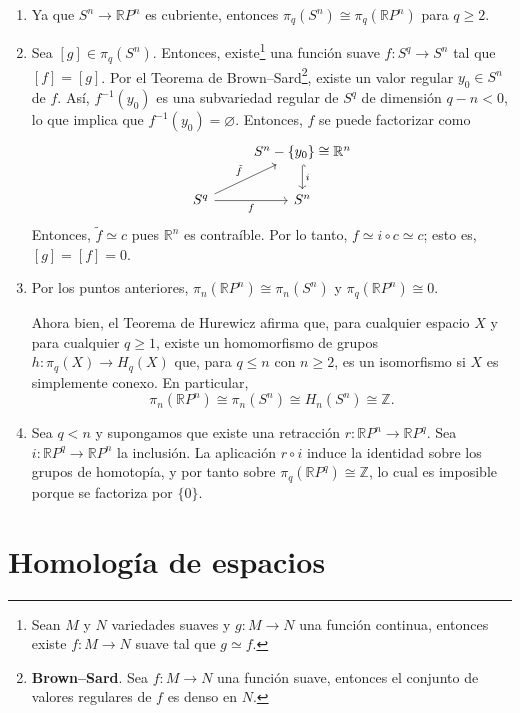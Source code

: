 \documentclass[11pt,a4paper]{article}
\theoremstyle{plain}
\theoremstyle{definition}
\theoremstyle{remark}
\newcommand{\RR}{\mathbb R}
\newcommand{\ZZ}{\mathbb Z}
\begin{document}
\begin{enumerate}[label=\arabic*.,leftmargin=*]
\begin{enumerate}[label=\alph*)]
También, es posible usar el ejercicio 4 como sigue:
\[
\pi_q(\mathbb T^2)=\pi_q(S^1)\oplus\pi_q(S^1)=\begin{cases}\ZZ\oplus\ZZ & q=1\\0 & q\ge0.\end{cases}
\]
\item Ya que $S^n\to\RR P^n$ es cubriente, entonces
$\pi_q(S^n)\cong\pi_q(\RR P^n)$ para $q\ge2$.
\item Sea $[g]\in\pi_q(S^n)$. Entonces, existe\footnote{Sean $M$ y $N$
variedades suaves y $g:M\to N$ una función continua, entonces existe
$f:M\to N$ suave tal que $g\simeq f$.} una función suave $f:S^q\to S^n$
tal que $[f]=[g]$. Por el Teorema de Brown--Sard\footnote{\textbf{Brown--Sard}.
Sea $f:M\to N$ una función suave, entonces el conjunto de valores regulares
de $f$ es denso en $N$.}, existe un valor regular $y_0\in S^n$ de $f$. Así,
$f^{-1}(y_0)$ es una subvariedad regular de $S^q$ de dimensión $q-n<0$, lo
que implica que $f^{-1}(y_0)=\varnothing$. Entonces, $f$ se puede
factorizar como
\[
\begin{tikzcd}
& S^n-\{y_0\}\cong\RR^n \arrow[d,hook,"i"] \\
S^q \arrow[ur,"\tilde f"] \arrow[r,swap,"f"] & S^n
\end{tikzcd}
\]
Entonces, $\tilde f\simeq c$ pues $\RR^n$ es contraíble. Por lo tanto,
$f\simeq i\circ c\simeq c$; esto es, $[g]=[f]=0$.
\item Por los puntos anteriores, $\pi_n(\RR P^n)\cong\pi_n(S^n)$ y
$\pi_q(\RR P^n)\cong0$.

Ahora bien, el Teorema de Hurewicz afirma que, para cualquier espacio $X$ y
para cualquier $q\ge1$, existe un homomorfismo de grupos
$h:\pi_q(X)\to H_q(X)$ que, para $q\le n$ con $n\ge2$, es un isomorfismo si
$X$ es simplemente conexo. En particular,
\[
\pi_n(\RR P^n)\cong\pi_n(S^n)\cong H_n(S^n)\cong\ZZ.
\]
\item Sea $q<n$ y supongamos que existe una retracción $r:\RR P^n\to\RR P^q$.
Sea $i:\RR P^q\to\RR P^n$ la inclusión. La aplicación $r\circ i$ induce la
identidad sobre los grupos de homotopía, y por tanto sobre
$\pi_q(\RR P^q)\cong\ZZ$, lo cual es imposible porque se factoriza por
$\{0\}$.
\end{enumerate}

\end{enumerate}

\section{Homología de espacios}
\label{sec:homologia-espacios}
\end{document}
